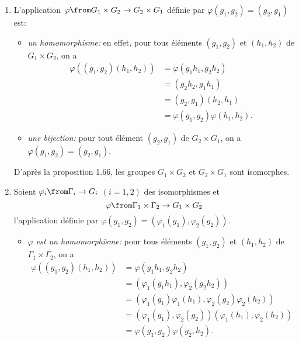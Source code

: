 \begin{enumerate}
  \item
    L'application $\varphi\from G_1\times G_2\to G_2\times G_1$ définie par $\varphi(g_1,g_2) = (g_2,g_1)$ est:
    \begin{itemize}
      \item
        \textit{un homomorphisme:}
        en effet, pour tous éléments $(g_1,g_2)$ et $(h_1,h_2)$ de $G_1\times G_2$, on a
        \begin{align*}
          \varphi((g_1,g_2)(h_1,h_2))
            &= \varphi(g_1h_1, g_2h_2) \\
            &= (g_2h_2, g_1h_1) \\
            &= (g_2,g_1)(h_2,h_1) \\
            &= \varphi(g_1,g_2)\varphi(h_1,h_2).
        \end{align*}

      \item
        \textit{une bijection:}
        pour tout élément $(g_2,g_1)$ de $G_2\times G_1$, on a $\varphi(g_1,g_2) = (g_2,g_1)$.
    \end{itemize}

    D'après la proposition 1.66, les groupes $G_1\times G_2$ et $G_2\times G_1$ sont isomorphes.

  \item
    Soient $\varphi_i\from\Gamma_i\to G_i$ $(i = 1,2)$ des isomorphismes et
    \[
      \varphi\from\Gamma_1\times\Gamma_2\to G_1\times G_2
    \]
    l'application définie par $\varphi(g_1,g_2) = (\varphi_1(g_1),\varphi_2(g_2))$.

    \begin{itemize}
      \item
        \textit{$\varphi$ est un homomorphisme:}
        pour tous éléments $(g_1,g_2)$ et $(h_1,h_2)$ de $\Gamma_1\times\Gamma_2$, on a
        \begin{align*}
          \varphi((g_1,g_2)(h_1,h_2))
            &= \varphi(g_1h_1,g_2h_2) \\
            &= (\varphi_1(g_1h_1),\varphi_2(g_2h_2)) \\
            &= (\varphi_1(g_1)\varphi_1(h_1),\varphi_2(g_2)\varphi_2(h_2)) \\
            &= (\varphi_1(g_1),\varphi_2(g_2))(\varphi_1(h_1),\varphi_2(h_2)) \\
            &= \varphi(g_1,g_2)\varphi(g_2,h_2).
        \end{align*}


\end{itemize}
\end{enumerate}
